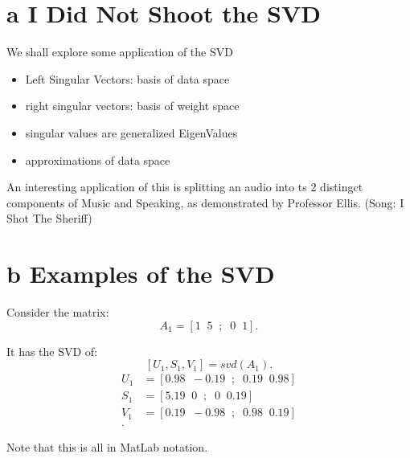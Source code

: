 \documentclass[12pt]{book}
\title{\coursetitle\linebreak\lecturename}
\author{\\Cain Susko\\ 
           \\ \\ \\
      Queen's University 
    \\School of Computing\\}
\begin{document}
\begin{titlepage}
        \maketitle
\end{titlepage}


\section*{a I Did Not Shoot the SVD}
We shall explore some application of the SVD
\begin{itemize}
        \item Left Singular Vectors: basis of data space
        \item right singular vectors: basis of weight space
        \item singular values are generalized EigenValues
        \item approximations of data space
\end{itemize}
An interesting application of this is splitting an audio into ts 2 distingct components of Music and Speaking, as
demonstrated by Professor Ellis. (Song: I Shot The Sheriff)

\section*{b Examples of the SVD}
Consider the matrix:
\[
A_1 = [1\;\;5\;\;;\;\;0\;\;1]
.\] 

It has the SVD of:
\[
[U_1,S_1,V_1] = svd\left( A_1 \right) 
.\] 
\begin{align*}
        U_1 &= [0.98\;\;-0.19\;\;;\;\; 0.19\;\; 0.98] \\
        S_1 &= [5.19\;\;0\;\;;\;\;0\;\;0.19]  \\
        V_1 &= [0.19\;\; -0.98\;\;;\;\;0.98\;\; 0.19]\\
.\end{align*}

Note that this is all in MatLab notation.
\pagebreak
\end{document}
